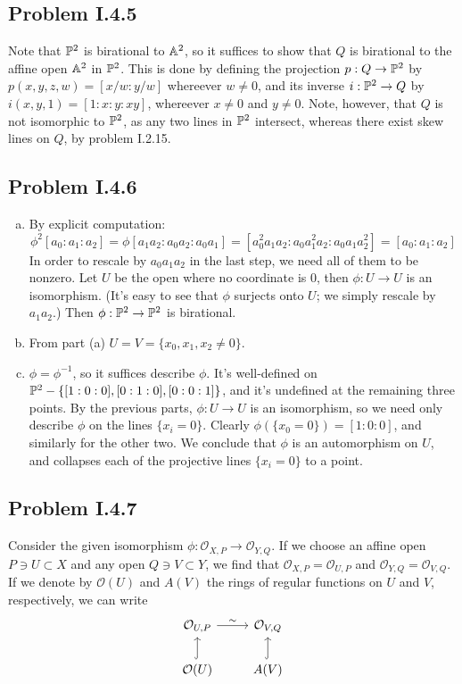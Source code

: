 \documentclass{mathnotes}
\begin{document}
\subsection*{Problem I.4.5}
Note that $\mathbb{P}^2$ is birational to $\mathbb{A}^2$, so it suffices to show that $Q$ is birational
to the affine open $\mathbb{A}^2$ in $\mathbb{P}^2$. This is done by defining the projection $p:Q\to\mathbb{P}^2$
by $p(x,y,z,w)=[x/w:y/w]$ whereever $w\neq 0$, and its inverse $i:\mathbb{P}^2\to Q$ by
$i(x,y,1)=[1:x:y:xy]$, whereever $x\neq0$ and $y\neq 0$. Note, however, that $Q$ is not isomorphic
to $\mathbb{P}^2$, as any two lines in $\mathbb{P}^2$ intersect, whereas there exist skew lines on $Q$,
by problem I.2.15.

\subsection*{Problem I.4.6}
\begin{enumerate}[(a)]
\item By explicit computation:
	\[     \phi^2 [a_0 : a_1 : a_2] = \phi [a_1a_2 : a_0a_2 : a_0 a_1] = 
	[a_0^2 a_1 a_2 : a_0a_1^2a_2 : a_0a_1a_2^2] = [a_0 : a_1 : a_2]      \]
	In order to rescale by $a_0a_1a_2$ in the last step, we need all of them to be nonzero. Let $U$ be 
	the open where no coordinate is 0, then $\phi : U \to U$ is an isomorphism. (It's easy to see that $\phi$
	surjects onto $U$; we simply rescale by $a_1a_2$.) Then $\phi : \mathbb{P}^2 \to \mathbb{P}^2$ is birational.
\item From part (a) $U = V = \{ x_0, x_1, x_2 \neq 0\}$.
\item $\phi = \phi^{-1}$, so it suffices describe $\phi$. It's well-defined on $\mathbb{P}^2 - \{[1:0:0],[0:1:0],[0:0:1]\}$,
	and it's undefined at the remaining three points. By the previous parts, $\phi : U \to U$ is an isomorphism, so
	we need only describe $\phi$ on the lines $\{x_i = 0\}$. Clearly $\phi(\{x_0 = 0\}) = [1:0:0]$, and similarly
	for the other two. We conclude that $\phi$ is an automorphism on $U$, and collapses each of the projective lines
	$\{x_i = 0\}$ to a point.
\end{enumerate}

\subsection*{Problem I.4.7}
Consider the given isomorphism $\phi:\mathcal{O}_{X,P}\to\mathcal{O}_{Y,Q}$. If we choose an affine open
$P\ni U\subset X$ and any open $Q\ni V\subset Y$, we find that $\mathcal{O}_{X,P}=\mathcal{O}_{U,P}$ and
$\mathcal{O}_{Y,Q}=\mathcal{O}_{V,Q}$. If we denote by $\mathcal{O}(U)$ and $A(V)$ the rings of regular
functions on $U$ and $V$, respectively, we can write
\begin{equation*}
    \begin{tikzcd}
        \mathcal{O}_{U,P}\arrow{r}{\sim}&\mathcal{O}_{V,Q}\\
        \mathcal{O}(U)\arrow[hook]{u}&A(V)\arrow[hook]{u}
    \end{tikzcd}
\end{equation*} 
\end{document}

